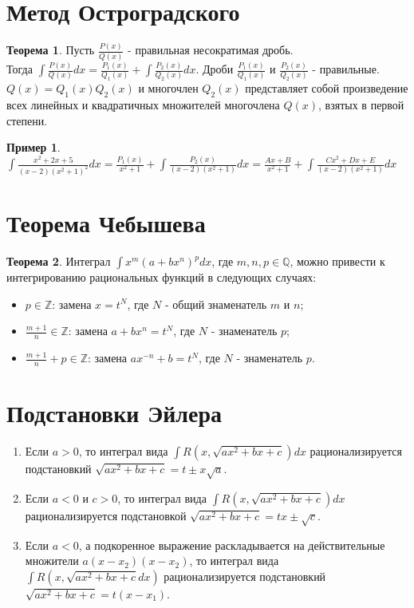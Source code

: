 \documentclass{report}
\theoremstyle{definition}
\newtheorem*{example}{Пример}
\newtheorem*{theorem}{Теорема}
\begin{document}
\section{Метод Остроградского}

\begin{theorem}
    Пусть $\frac{P(x)}{Q(x)}$ - правильная несократимая дробь. \\ Тогда $\int \frac{P(x)}{Q(x)}dx = \frac{P_{1}(x)}{Q_{1}(x)}
        + \int \frac{P_{2}(x)}{Q_{2}(x)}dx$. Дроби $\frac{P_{1}(x)}{Q_{1}(x)}$ и $\frac{P_{2}(x)}{Q_{2}(x)}$ - правильные.
    $Q(x) = Q_{1}(x) Q_{2}(x)$ и многочлен $Q_{2}(x)$ представляет собой произведение всех линейных и квадратичных множителей
    многочлена $Q(x)$, взятых в первой степени.
\end{theorem}

\begin{example}
    $\int \frac{x^{2} + 2x + 5}{(x-2)(x^{2} + 1)^{2}}dx = \frac{P_{1}(x)}{x^{2} + 1} + \int \frac{P_{2}(x)}{(x-2)(x^{2}+1)}dx
        = \frac{Ax + B}{x^{2} + 1} + \int \frac{Cx^{2} + Dx + E}{(x-2)(x^{2}+1)}dx$
\end{example}

\section{Теорема Чебышева}

\begin{theorem}
    Интеграл $\int x^m(a+bx^n)^pdx$, где $m,n,p \in \mathbb{Q}$, можно привести к интегрированию рациональных функций в следующих случаях:
    \begin{itemize}
        \item $p \in \mathbb{Z}$: замена $x = t^N$, где $N$ - общий знаменатель $m$ и $n$;
        \item $\frac{m+1}{n}\in \mathbb{Z}$: замена $a + bx^n = t^N$, где $N$ - знаменатель $p$;
        \item $\frac{m+1}{n} + p \in \mathbb{Z}$: замена $ax^{-n} + b = t^N$, где $N$ - знаменатель $p$.
    \end{itemize}
\end{theorem}

\section{Подстановки Эйлера}

\begin{enumerate}
    \item Если $a > 0$, то интеграл вида $\int R(x,\sqrt{ax^2 + bx + c})dx$ рационализируется подстановкий $\sqrt{ax^2 + bx + c} = t \pm x\sqrt{a}$.
    \item Если $a < 0$ и $c > 0$, то интеграл вида $\int R(x,\sqrt{ax^2 + bx + c})dx$ рационализируется подстановкой $\sqrt{ax^2 + bx + c} = tx \pm \sqrt{c}$.
    \item Если $a < 0$, а подкоренное выражение раскладывается на действительные множители $a(x-x_2)(x-x_2)$, то интеграл вида $\int R(x,\sqrt{ax^2 + bx + c}dx)$ рационализируется подстановкий $\sqrt{ax^2 + bx + c} = t(x-x_1)$.
\end{enumerate}
\end{document}
